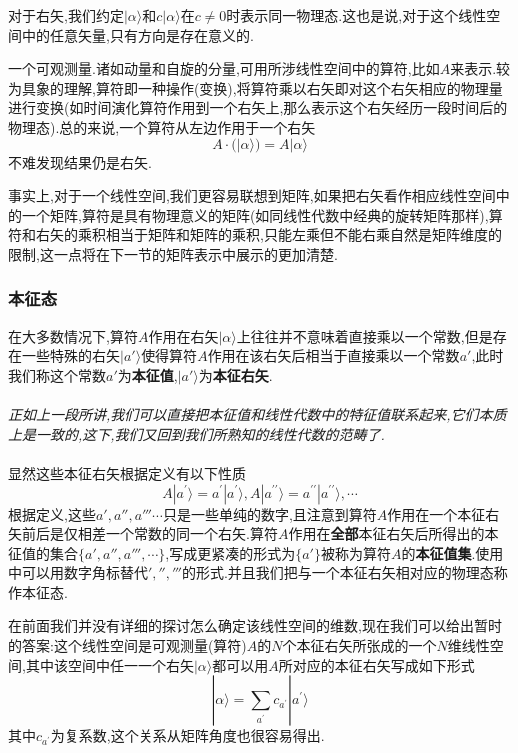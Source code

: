 对于右矢,我们约定$|\alpha\rangle$和$c|\alpha\rangle$在$c\ne0$时表示同一物理态.这也是说,对于这个线性空间中的任意矢量,只有方向是存在意义的.

一个可观测量.诸如动量和自旋的分量,可用所涉线性空间中的算符,比如$A$来表示.较为具象的理解,算符即一种操作(变换),将算符乘以右矢即对这个右矢相应的物理量进行变换(如时间演化算符作用到一个右矢上,那么表示这个右矢经历一段时间后的物理态).总的来说,一个算符从左边作用于一个右矢
\begin{equation}
	A\cdot(|\alpha\rangle)=A|\alpha\rangle 
\end{equation}
不难发现结果仍是右矢.\\
\begin{remark}
	事实上,对于一个线性空间,我们更容易联想到矩阵,如果把右矢看作相应线性空间中的一个矩阵,算符是具有物理意义的矩阵(如同线性代数中经典的旋转矩阵那样),算符和右矢的乘积相当于矩阵和矩阵的乘积,只能左乘但不能右乘自然是矩阵维度的限制,这一点将在下一节的矩阵表示中展示的更加清楚.
\end{remark}
\subsubsection*{本征态}
在大多数情况下,算符$A$作用在右矢$|\alpha\rangle$上往往并不意味着直接乘以一个常数,但是存在一些特殊的右矢$|a'\rangle$使得算符$A$作用在该右矢后相当于直接乘以一个常数$a'$,此时我们称这个常数$a'$为\textbf{本征值},$|a'\rangle$为\textbf{本征右矢}.\\\\
\textit{正如上一段所讲,我们可以直接把本征值和线性代数中的特征值联系起来,它们本质上是一致的,这下,我们又回到我们所熟知的线性代数的范畴了.}\\\\
显然这些本征右矢根据定义有以下性质
\begin{equation}
	A| a^{\prime}\rangle=a^{\prime}| a^{\prime}\rangle,A| a^{\prime\prime}\rangle=a^{\prime\prime}| a^{\prime\prime}\rangle,\cdots
\end{equation}
根据定义,这些$a',a'',a'''\cdots$只是一些单纯的数字,且注意到算符$A$作用在一个本征右矢前后是仅相差一个常数的同一个右矢.算符$A$作用在\textbf{全部}本征右矢后所得出的本征值的集合$\{a',a'',a''',\cdots\}$,写成更紧凑的形式为$\{a'\}$被称为算符$A$的\textbf{本征值集}.使用中可以用数字角标替代$','','''$的形式.并且我们把与一个本征右矢相对应的物理态称作本征态.

在前面我们并没有详细的探讨怎么确定该线性空间的维数,现在我们可以给出暂时的答案:这个线性空间是可观测量(算符)$A$的$N$个本征右矢所张成的一个$N$维线性空间,其中该空间中任一一个右矢$|\alpha\rangle$都可以用$A$所对应的本征右矢写成如下形式
\begin{equation}
	|\alpha\rangle=\sum_{a^{\prime}}c_{a^{\prime}}| a^{\prime}\rangle 
\end{equation}
其中$c_{a^{\prime}}$为复系数,这个关系从矩阵角度也很容易得出.
